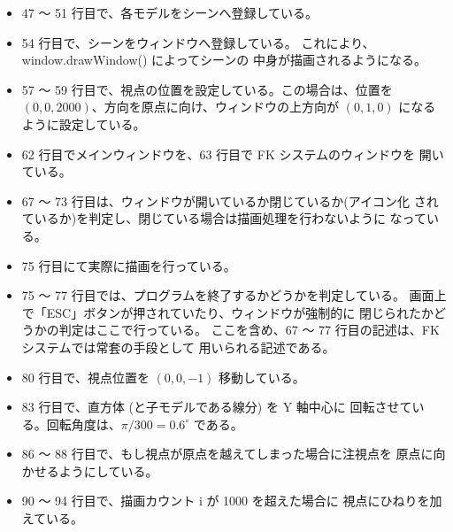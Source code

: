 \begin{itemize}
 \item 47 〜 51 行目で、各モデルをシーンへ登録している。
 \item 54 行目で、シーンをウィンドウへ登録している。
	これにより、window.drawWindow() によってシーンの
	中身が描画されるようになる。
 \item 57 〜 59 行目で、視点の位置を設定している。この場合は、位置を
	\((0, 0, 2000)\)、方向を原点に向け、ウィンドウの上方向が
	\((0, 1, 0)\) になるように設定している。
 \item 62 行目でメインウィンドウを、63 行目で FK システムのウィンドウを
	開いている。
 \item 67 〜 73 行目は、ウィンドウが開いているか閉じているか(アイコン化
	されているか)を判定し、閉じている場合は描画処理を行わないように
	なっている。
 \item 75 行目にて実際に描画を行っている。
 \item 75 〜 77 行目では、プログラムを終了するかどうかを判定している。
	画面上で「ESC」ボタンが押されていたり、ウィンドウが強制的に
	閉じられたかどうかの判定はここで行っている。
	ここを含め、67 〜 77 行目の記述は、FK システムでは常套の手段として
	用いられる記述である。
 \item 80 行目で、視点位置を \((0, 0, -1)\) 移動している。
 \item 83 行目で、直方体 (と子モデルである線分) を Y 軸中心に
	回転させている。回転角度は、\(\pi/300 = 0.6 ^{\circ}\) である。
 \item 86 〜 88 行目で、もし視点が原点を越えてしまった場合に注視点を
	原点に向かせるようにしている。
 \item 90 〜 94 行目で、描画カウント i が 1000 を超えた場合に
	視点にひねりを加えている。
\end{itemize}

